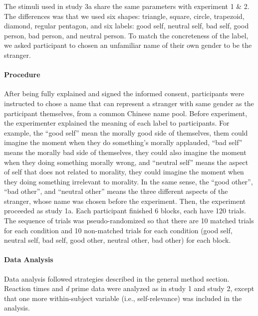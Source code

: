 \documentclass[
  english,
  man]{apa6}
\let\oldparagraph\paragraph
\renewcommand{\paragraph}[1]{\oldparagraph{#1}\mbox{}}
\begin{document}
The stimuli used in study 3a share the same parameters with experiment 1 \& 2. The differences was that we used six shapes: triangle, square, circle, trapezoid, diamond, regular pentagon, and six labels: good self, neutral self, bad self, good person, bad person, and neutral person. To match the concreteness of the label, we asked participant to chosen an unfamiliar name of their own gender to be the stranger.

\hypertarget{procedure-5}{%
\paragraph{Procedure}\label{procedure-5}}

After being fully explained and signed the informed consent, participants were instructed to chose a name that can represent a stranger with same gender as the participant themselves, from a common Chinese name pool. Before experiment, the experimenter explained the meaning of each label to participants. For example, the \enquote{good self} mean the morally good side of themselves, them could imagine the moment when they do something's morally applauded, \enquote{bad self} means the morally bad side of themselves, they could also imagine the moment when they doing something morally wrong, and \enquote{neutral self} means the aspect of self that does not related to morality, they could imagine the moment when they doing something irrelevant to morality. In the same sense, the \enquote{good other}, \enquote{bad other}, and \enquote{neutral other} means the three different aspects of the stranger, whose name was chosen before the experiment. Then, the experiment proceeded as study 1a. Each participant finished 6 blocks, each have 120 trials. The sequence of trials was pseudo-randomized so that there are 10 matched trials for each condition and 10 non-matched trials for each condition (good self, neutral self, bad self, good other, neutral other, bad other) for each block.

\hypertarget{data-analysis-6}{%
\paragraph{Data Analysis}\label{data-analysis-6}}

Data analysis followed strategies described in the general method section. Reaction times and \emph{d} prime data were analyzed as in study 1 and study 2, except that one more within-subject variable (i.e., self-relevance) was included in the analysis.
\end{document}
